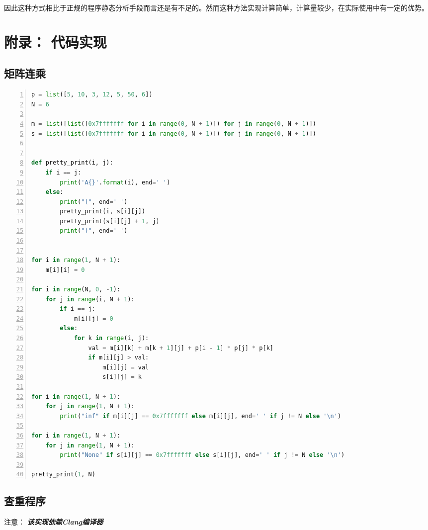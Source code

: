 \documentclass[a4paper,twoside]{article}
\begin{document}
\begin{spacing}{1.2}
因此这种方式相比于正规的程序静态分析手段而言还是有不足的。然而这种方法实现计算简单，计算量较少，在实际使用中有一定的优势。


\clearpage
\appendix

\section{附录： 代码实现}
\label{sec:app_impl}

\subsection{矩阵连乘}
\begin{lstlisting}[language=Python,numbers=left,style=PythonStyle,caption=矩阵连乘,label={code:implmat}]
p = list([5, 10, 3, 12, 5, 50, 6])
N = 6

m = list([list([0x7fffffff for i in range(0, N + 1)]) for j in range(0, N + 1)])
s = list([list([0x7fffffff for i in range(0, N + 1)]) for j in range(0, N + 1)])


def pretty_print(i, j):
    if i == j:
        print('A{}'.format(i), end=' ')
    else:
        print("(", end=' ')
        pretty_print(i, s[i][j])
        pretty_print(s[i][j] + 1, j)
        print(")", end=' ')


for i in range(1, N + 1):
    m[i][i] = 0

for i in range(N, 0, -1):
    for j in range(i, N + 1):
        if i == j:
            m[i][j] = 0
        else:
            for k in range(i, j):
                val = m[i][k] + m[k + 1][j] + p[i - 1] * p[j] * p[k]
                if m[i][j] > val:
                    m[i][j] = val
                    s[i][j] = k

for i in range(1, N + 1):
    for j in range(1, N + 1):
        print("inf" if m[i][j] == 0x7fffffff else m[i][j], end=' ' if j != N else '\n')

for i in range(1, N + 1):
    for j in range(1, N + 1):
        print("None" if s[i][j] == 0x7fffffff else s[i][j], end=' ' if j != N else '\n')

pretty_print(1, N)

\end{lstlisting}

\clearpage

\subsection{查重程序}

注意： \emph{\textbf{该实现依赖Clang编译器}}


\end{spacing}
\end{document}
